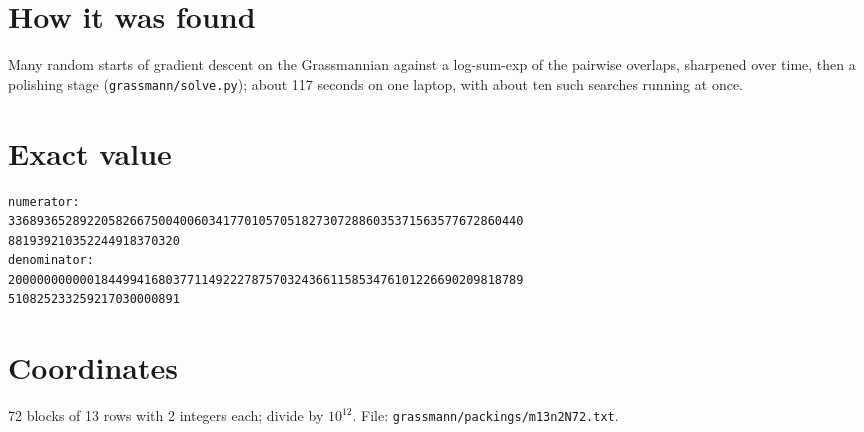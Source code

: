 \documentclass[11pt,a4paper]{article}
\begin{document}
\section{How it was found}
Many random starts of gradient descent on the Grassmannian against a log-sum-exp of the pairwise overlaps, sharpened over time, then a polishing stage (\texttt{grassmann/solve.py}); about 117 seconds on one laptop, with about ten such searches running at once.


\appendix
\section{Exact value}
{\small
\begin{verbatim}
numerator:
336893652892205826675004006034177010570518273072886035371563577672860440
881939210352244918370320
denominator:
200000000000184499416803771149222787570324366115853476101226690209818789
510825233259217030000891
\end{verbatim}}

\section{Coordinates}
72 blocks of 13 rows with 2 integers each; divide by $10^{12}$. File: \texttt{grassmann/packings/m13n2N72.txt}.
{\tiny
\begin{multicols}{4}
\end{multicols}}
\end{document}

